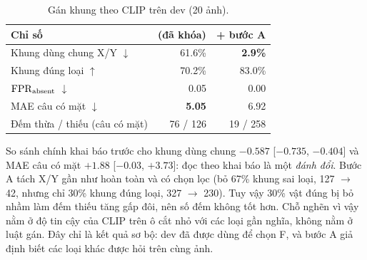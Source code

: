 \documentclass[12pt,a4paper]{article}
\begin{document}
\begin{table}[ht]
\centering
\caption{Gán khung theo CLIP trên dev (20 ảnh).}
\label{tab:xyclip}
\small
\begin{tabular}{@{}lrr@{}}
\toprule
Chỉ số & \PF{} (đã khóa) & \PF{} + bước A\\
\midrule
Khung dùng chung X/Y $\downarrow$ & 61.6\% & \textbf{2.9\%}\\
Khung đúng loại $\uparrow$ & 70.2\% & 83.0\%\\
$\mathrm{FPR}_{\text{absent}}$ $\downarrow$ & 0.05 & 0.00\\
MAE câu có mặt $\downarrow$ & \textbf{5.05} & 6.92\\
Đếm thừa / thiếu (câu có mặt) & 76 / 126 & 19 / 258\\
\bottomrule
\end{tabular}
\end{table}

So sánh chính khai báo trước cho khung dùng chung $-0.587$ [$-0.735$, $-0.404$] và MAE câu có mặt $+1.88$ [$-0.03$, $+3.73$]: đọc theo khai báo là một \emph{đánh đổi}. Bước A tách X/Y gần như hoàn toàn và có chọn lọc (bỏ 67\% khung sai loại, 127 $\to$ 42, nhưng chỉ 30\% khung đúng loại, 327 $\to$ 230). Tuy vậy 30\% vật đúng bị bỏ nhầm làm đếm thiếu tăng gấp đôi, nên số đếm không tốt hơn. Chỗ nghẽn vì vậy nằm ở độ tin cậy của CLIP trên ô cắt nhỏ với các loại gần nghĩa, không nằm ở luật gán. Đây chỉ là kết quả sơ bộ: dev đã được dùng để chọn F, và bước A giả định biết các loại khác được hỏi trên cùng ảnh.

\end{document}
